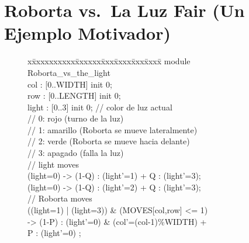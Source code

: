 \newcommand{\roborta}{Roborta\xspace}
\section{\roborta vs.\ La Luz Fair (Un Ejemplo Motivador)} \label{sec:mot_example_fair}

\begin{figure}[t]
\centering
\begin{minipage}[t]{.47\textwidth}
{\fontsize{7.6}{7.6}\selectfont\ttfamily
\begin{tabbing}
x\=xxxxxxxxxx\=xxxxxx\=xxx\=xxxx\=xxx\=xxxx\= \kill    
module \roborta\_vs\_the\_light\\[1ex]
\>col : [0..WIDTH] init 0; \\
\>row : [0..LENGTH] init 0; \\
\>light : [0..3] init 0; \>\>\>\> // color de luz actual \\%
\>                   \>\>\>\>// 0: rojo (turno de la luz) \\%
\>                   \>\>\>\>// 1: amarillo (\roborta se mueve lateralmente) \\%
\>                   \>\>\>\>// 2: verde (\roborta se mueve hacia delante) \\%
\>                   \>\>\>\>// 3: apagado (falla la luz) \\[1ex]
\> // light moves \\[1ex]
\>[l\_y] (light=0) \> \>-> \>(1-Q) : (light'=1) + Q : (light'=3);\\[1ex]
\>[l\_g] (light=0) \> \>-> \>(1-Q) : (light'=2) + Q : (light'=3);\\[1ex]
\> // \roborta moves \\[1ex]
\>[r\_l]  ((light=1) | (light=3)) \& (MOVES[col,row] <= 1)  \\
\>                    \>\>-> \>(1-P) : (light'=0) \& (col'=(col-1)\%WIDTH) + \\       
\>                     \>\>\>  P : (light'=0) ; \\[1ex]


\end{tabbing}}
\end{minipage}
\end{figure}
